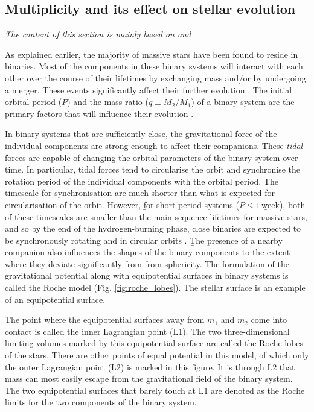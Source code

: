 \subsection{Multiplicity and its effect on stellar evolution}

\textit{The content of this section is mainly based on \citet{1992podsiadlowski} and \citet{2001hilditch_close_binaries}}

As explained earlier, the majority of massive stars have been found to reside in binaries. Most of the components in these binary systems will interact with each other over the course of their lifetimes by exchanging mass and/or by undergoing a merger. These events significantly affect their further evolution \citep[see, e.g.][]{1994pols_caseA,langer_presupernova_2012}. The initial orbital period ($P$) and the mass-ratio ($q \equiv M_2/M_1$) of a binary system are the primary factors that will influence their evolution \citep{1992podsiadlowski}.

In binary systems that are sufficiently close, the gravitational force of the individual components are strong enough to affect their companions. These \textit{tidal} forces are capable of changing the orbital parameters of the binary system over time. In particular, tidal forces tend to circularise the orbit and synchronise the rotation period of the individual components with the orbital period. The timescale for synchronisation are much shorter than what is expected for circularisation of the orbit. However, \b{for short-period systems (}$P \leq 1\,$\b{week),}  both of these timescales are smaller than the main-sequence lifetimes for massive stars, and so by the end of the hydrogen-burning phase, close binaries are expected to be synchronously rotating and in circular orbits \citep{1981Hut,1977Zahn}. \b{The presence of a nearby companion} also influences the shapes of the binary components to the extent where they deviate significantly from from sphericity. The formulation of the gravitational potential along with equipotential surfaces in binary systems is called the Roche model (Fig. \ref{fig:roche_lobes}). The stellar surface is an example of an equipotential surface.

The point where the equipotential surfaces away from $m_1$ and $m_2$ come into contact is called the inner Lagrangian point (L1). The two three-dimensional limiting volumes marked by this equipotential surface are called the Roche lobes of the stars. There are other points of equal potential in this model, of which only the outer Lagrangian point (L2) is marked in this figure. It is through L2 that mass can most easily escape from the gravitational field of the binary system. The two equipotential surfaces that barely touch at L1 are denoted as the Roche limits for the two components of the binary system.

